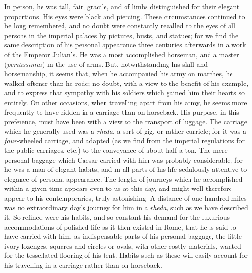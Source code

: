 In person, he was tall, fair, gracile, and of limbs distinguished for
their elegant proportions. His eyes were black and piercing. These
circumstances continued to be long remembered, and no doubt were
constantly recalled to the eyes of all persons in the imperial palaces
by pictures, busts, and statues; for we find the same description of his
personal appearance three centuries afterwards in a work of the Emperor
Julian's. He was a most accomplished horseman, and a master
(\emph{peritissimus}) in the use of arms. But, notwithstanding his skill and
horsemanship, it seems that, when he accompanied his army on marches, he
walked oftener than he rode; no doubt, with a view to the benefit of his
example, and to express that sympathy with his soldiers which gained him
their hearts so entirely. On other occasions, when travelling apart from
his army, he seems more frequently to have ridden in a carriage than on
horseback. His purpose, in this preference, must have been with a view
to the transport of luggage. The carriage which he generally used was a
\emph{rheda}, a sort of gig, or rather curricle; for it was a \emph{four}-wheeled
carriage, and adapted (as we find from the imperial regulations for the
public carriages, etc.) to the conveyance of about half a ton. The mere
personal baggage which Caesar carried with him was probably
considerable; for he was a man of elegant habits, and in all parts of
his life sedulously attentive to elegance of personal appearance. The
length of journeys which he accomplished within a given time appears
even to us at this day, and might well therefore appear to his
contemporaries, truly astonishing. A distance of one hundred miles was
no extraordinary day's journey for him in a \emph{rheda}, such as we have
described it. So refined were his habits, and so constant his demand for
the luxurious accommodations of polished life as it then existed in
Rome, that he is said to have carried with him, as indispensable parts
of his personal baggage, the little ivory lozenges, squares and circles
or ovals, with other costly materials, wanted for the tessellated
flooring of his tent. Habits such as these will easily account for his
travelling in a carriage rather than on horseback.

